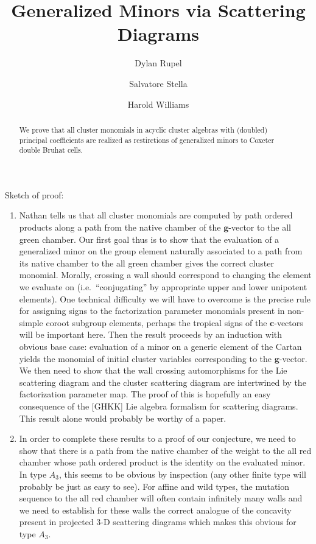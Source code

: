\documentclass{amsart}
\title{Generalized Minors via Scattering Diagrams}
\author{Dylan Rupel}
\author{Salvatore Stella}
\author{Harold Williams}
\newcommand{\bfc}{\mathbf{c}}
\newcommand{\bfg}{\mathbf{g}}
\begin{document}
  \maketitle
  \begin{abstract}
    We prove that all cluster monomials in acyclic cluster algebras with (doubled) principal coefficients are realized as restirctions of generalized minors to Coxeter double Bruhat cells.
  \end{abstract}

  Sketch of proof:
  \begin{enumerate}
    \item Nathan tells us that all cluster monomials are computed by path ordered products along a path from the native chamber of the $\bfg$-vector to the all green chamber.
      Our first goal thus is to show that the evaluation of a generalized minor on the group element naturally associated to a path from its native chamber to the all green chamber gives the correct cluster monomial.
      Morally, crossing a wall should correspond to changing the element we evaluate on (i.e.\ ``conjugating'' by appropriate upper and lower unipotent elements).
      One technical difficulty we will have to overcome is the precise rule for assigning signs to the factorization parameter monomials present in non-simple coroot subgroup elements, perhaps the tropical signs of the $\bfc$-vectors will be important here.
      Then the result proceeds by an induction with obvious base case: evaluation of a minor on a generic element of the Cartan yields the monomial of initial cluster variables corresponding to the $\bfg$-vector.
      We then need to show that the wall crossing automorphisms for the Lie scattering diagram and the cluster scattering diagram are intertwined by the factorization parameter map.
      The proof of this is hopefully an easy consequence of the [GHKK] Lie algebra formalism for scattering diagrams.
      This result alone would probably be worthy of a paper.
    \item In order to complete these results to a proof of our conjecture, we need to show that there is a path from the native chamber of the weight to the all red chamber whose path ordered product is the identity on the evaluated minor.
      In type $A_3$, this seems to be obvious by inspection (any other finite type will probably be just as easy to see).
      For affine and wild types, the mutation sequence to the all red chamber will often contain infinitely many walls and we need to establish for these walls the correct analogue of the concavity present in projected 3-D scattering diagrams which makes this obvious for type $A_3$.
  \end{enumerate}
  
\end{document}
